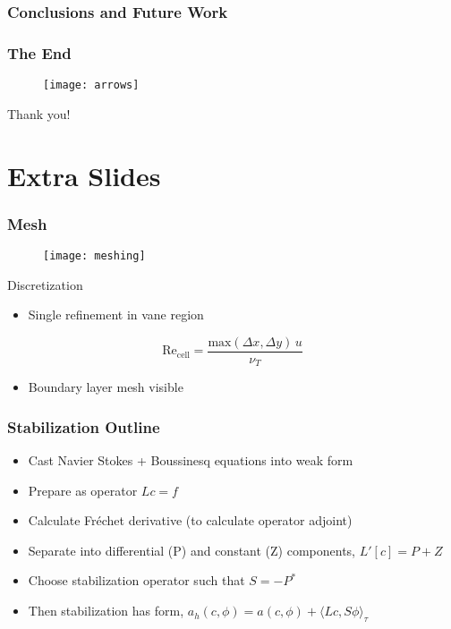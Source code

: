 \documentclass[mathserif]{beamer}
\begin{document}
%
%
\begin{frame}
 \frametitle{Conclusions and Future Work}


\end{frame}

 \begin{frame}
   \frametitle{The End}

   \begin{figure}[htb]
     \centering
     \texttt{[image: arrows]}
   \end{figure}

   \begin{block}{Thank you!}
    \end{block}
 \end{frame}


%
\appendix
\section{Extra Slides}


%
%
\begin{frame}
 \frametitle{Mesh}
 
 \begin{figure}[htb]
  \centering
  \texttt{[image: meshing]}
 \end{figure}
 
 \begin{block}{Discretization}
  \begin{itemize}
   \item Single refinement in vane region
  \end{itemize}
\begin{equation*}
	  \text{Re}_\text{cell} = \frac{\text{max}(\Delta x,\Delta y)
	   \, u}{\nu_T}
\end{equation*}	
  \begin{itemize}
   \item Boundary layer mesh visible
  \end{itemize}
 \end{block}
\end{frame}

%
%
\begin{frame}
\frametitle{Stabilization Outline}

\begin{itemize}
 \item Cast Navier Stokes + Boussinesq equations into weak form
 \item Prepare as operator $Lc=f$
 \item Calculate Fr\'echet derivative (to calculate operator adjoint)
 \item Separate into differential (P) and constant (Z) components,
       $L'[c] = P + Z$
 \item Choose stabilization operator such that $S = -P^*$
 \item Then stabilization has form, $a_h(c,\phi) = a(c,\phi) + \langle
       Lc,S\phi \rangle_\tau$
\end{itemize}
\end{frame}
\end{document}
